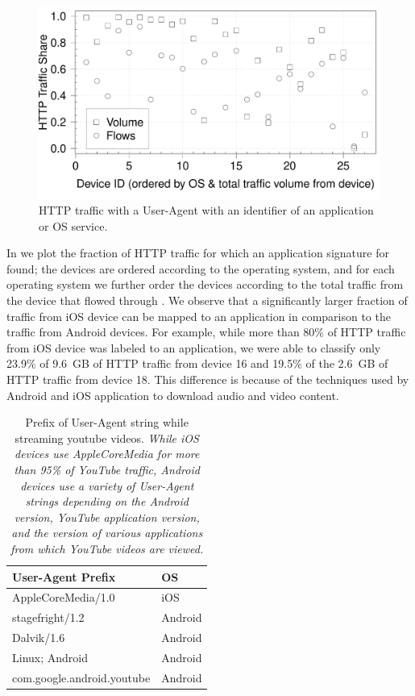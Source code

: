 \begin{figure}
\includegraphics[width=\columnwidth]{plots/appusage_someappsig_traffic.pdf}
\caption{HTTP traffic with a User-Agent with an identifier of an application or OS service.}
\label{fig:http-classification-app-user-agent}
\end{figure}

In  we plot the fraction of HTTP traffic for which an application signature for found; the devices are ordered according to the operating system, and for each operating system we further order the devices according to the total traffic from the device that flowed through \platname. 
We observe that a significantly larger fraction of traffic from iOS device can be mapped to an application in comparison to the traffic from Android devices. 
For example, while more than 80\% of HTTP traffic from iOS device was labeled to an application, we were able to classify only 23.9\% of 9.6~GB of HTTP traffic from device 16 and 19.5\% of the 2.6~GB of HTTP traffic from device 18.
This difference is because of the techniques used by Android and iOS application to download audio and video content. 

\begin{table}
\begin{tabular}{|l|l|}
\hline
User-Agent Prefix& OS \tabularnewline
\hline
AppleCoreMedia/1.0 & iOS \tabularnewline
stagefright/1.2 & Android \tabularnewline
Dalvik/1.6 & Android \tabularnewline
Linux; Android & Android \tabularnewline
com.google.android.youtube & Android \tabularnewline
\hline
\end{tabular}
\caption{Prefix of User-Agent string while streaming youtube videos. \emph{While iOS devices use AppleCoreMedia for more than 95\% of YouTube traffic, Android devices use a variety of User-Agent strings depending on the Android version, YouTube application version, and the version of various applications from which YouTube videos are viewed.}}
\label{tab:top-user-agents}
\end{table}

